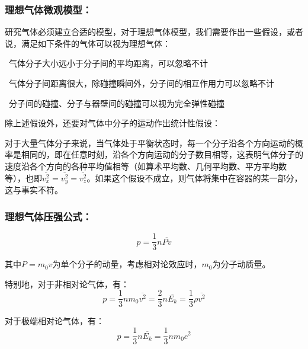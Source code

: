 \documentclass[zihao=-4,UTF8]{report}
\begin{document}
\subsubsection{理想气体微观模型：}
研究气体必须建立合适的模型，对于理想气体模型，我们需要作出一些假设，或者说，满足如下条件的气体可以视为理想气体：\par
{}\ 气体分子大小远小于分子间的平均距离，可以忽略不计\par
{}\ 气体分子间距离很大，除碰撞瞬间外，分子间的相互作用力可以忽略不计\par
{}\ 分子间的碰撞、分子与器壁间的碰撞可以视为完全弹性碰撞\par
除上述假设外，还要对气体中分子的运动作出统计性假设：\par
对于大量气体分子来说，当气体处于平衡状态时，每一个分子沿各个方向运动的概率是相同的，即在任意时刻，沿各个方向运动的分子数目相等，这表明气体分子的速度沿各个方向的各种平均值相等（如算术平均数、几何平均数、平方平均数等），也即$\overline{v^2_x}=\overline{v^2_y}=\overline{v^2_z}$。如果这个假设不成立，则气体将集中在容器的某一部分，这与事实不符。

\subsubsection{理想气体压强公式：}\noindent
\begin{equation}
    p= \frac{1}{3}n \overline{Pv} 
    \label{理想气体压强公式}
\end{equation}\par
{\color{gray}\small 其中$P = m_0v$为单个分子的动量，考虑相对论效应时，$m_0$为分子动质量。}\par
特别地，对于非相对论气体，有：
\begin{equation}
    p = \frac{1}{3}nm_0\overline{v^2} = \frac{2}{3}n\overline{E_k} = \frac{1}{3}\rho \overline{v^2} 
\end{equation}\par
对于极端相对论气体，有：
\begin{equation}
    p = \frac{1}{3}n\overline{E_k} = \frac{1}{3}nm_0c^2
\end{equation}
\end{document}
